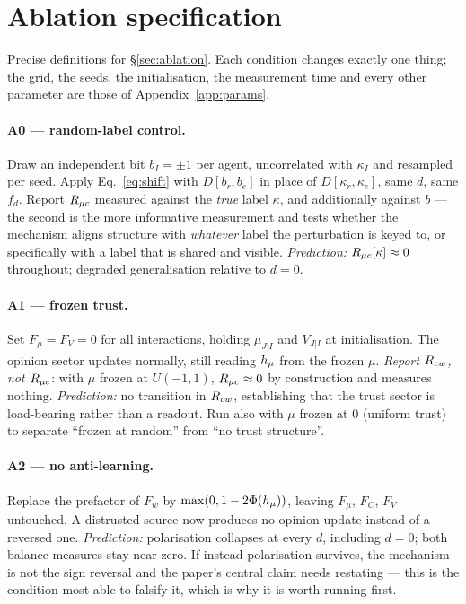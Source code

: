 \section{Ablation specification}
\label{app:ablation}

Precise definitions for \S\ref{sec:ablation}. Each condition changes exactly one
thing; the grid, the seeds, the initialisation, the measurement time and every
other parameter are those of Appendix~\ref{app:params}.

\paragraph{A0 --- random-label control.} Draw an independent bit $b_I = \pm 1$ per
agent, uncorrelated with $\kappa_I$ and resampled per seed. Apply
Eq.~\ref{eq:shift} with $D[b_r, b_e]$ in place of $D[\kappa_r, \kappa_e]$, same
$d$, same $f_d$. Report $R_{\mu c}$ measured against the \emph{true} label $\kappa$, and
additionally against $b$ --- the second is the more informative measurement and
tests whether the mechanism aligns structure with \emph{whatever} label the
perturbation is keyed to, or specifically with a label that is shared and visible.
\emph{Prediction:} $R_{\mu c}[\kappa] \approx 0$ throughout; degraded generalisation
relative to $d = 0$.

\paragraph{A1 --- frozen trust.} Set $F_\mu = F_V = 0$ for all interactions,
holding $\mu_{J|I}$ and $V_{J|I}$ at initialisation. The opinion sector updates
normally, still reading $h_{\mu}$ from the frozen $\mu$. \emph{Report $R_{cw}$, not
$R_{\mu c}$}: with $\mu$ frozen at $U(-1,1)$, $R_{\mu c} \approx 0$ by construction and
measures nothing. \emph{Prediction:} no transition in $R_{cw}$, establishing that
the trust sector is load-bearing rather than a readout. Run also with $\mu$ frozen
at $0$ (uniform trust) to separate ``frozen at random'' from ``no trust
structure''.

\paragraph{A2 --- no anti-learning.} Replace the prefactor of $F_w$ by
$\max(0, 1 - 2\Phi(h_{\mu}))$, leaving $F_\mu$, $F_C$, $F_V$ untouched. A distrusted
source now produces no opinion update instead of a reversed one. \emph{Prediction:}
polarisation collapses at every $d$, including $d = 0$; both balance measures stay
near zero. If instead polarisation survives, the mechanism is not the sign reversal
and the paper's central claim needs restating --- this is the condition most able
to falsify it, which is why it is worth running first.

